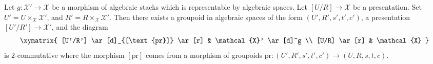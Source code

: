 \begin{lemma}
\label{lemma-representable-in-terms-presentations}
Let $g : \mathcal{X}' \to \mathcal{X}$ be a morphism of algebraic stacks
which is representable by algebraic spaces. Let $[U/R] \to \mathcal{X}$
be a presentation. Set $U' = U \times_\mathcal{X} \mathcal{X}'$,
and $R' = R \times_\mathcal{X} \mathcal{X}'$.
Then there exists a groupoid in algebraic spaces of the form
$(U', R', s', t', c')$, a presentation $[U'/R'] \to \mathcal{X}'$,
and the diagram
$$
\xymatrix{
[U'/R'] \ar[d]_{[\text{pr}]} \ar[r] & \mathcal{X}' \ar[d]^g \\
[U/R] \ar[r] & \mathcal{X}
}
$$
is $2$-commutative where the morphism $[\text{pr}]$ comes from a
morphism of groupoids
$\text{pr} : (U', R', s', t', c') \to (U, R, s, t, c)$.
\end{lemma}

